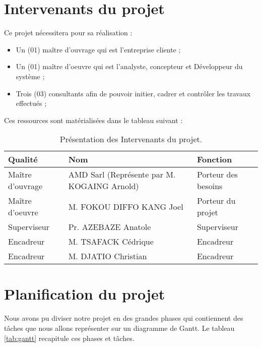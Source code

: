 \section{Intervenants du projet}
Ce projet nécessitera pour sa réalisation :
\begin{itemize}
    \item Un (01) maître d'ouvrage qui est l'entreprise cliente ;
    \item Un (01) maître d'oeuvre qui est l'analyste, concepteur et Développeur du système ;
    \item Trois (03) consultants afin de pouvoir initier, cadrer et contrôler les travaux effectués ;    
\end{itemize}

Ces ressources sont matérialisées dans le tableau suivant :
\begin{table}[H]
    \centering
    \caption{Présentation des Intervenants du projet.}
    \begin{tabular}[t]{|p{4cm}|p{7cm}|p{4cm}|}
        \hline
        \textbf{Qualité } & \textbf{Nom} & \textbf{Fonction} \\
        \hline\hline
        Maître d'ouvrage & AMD Sarl (Représente par M. KOGAING Arnold) & Porteur des besoins\\
        \hline
        Maître d'oeuvre & M. FOKOU DIFFO KANG Joel & Porteur du projet \\
        \hline
        Superviseur & Pr. AZEBAZE Anatole & Superviseur\\
        \hline
        Encadreur & M. TSAFACK Cédrique & Encadreur\\
        \hline
        Encadreur & M. DJATIO Christian & Encadreur\\
        \hline\hline
    \end{tabular}
    \label{tab:resmat}
\end{table}%



\section{Planification du projet}
Nous avons pu diviser notre projet en des grandes phases qui contiennent des tâches que nous allons représenter sur un diagramme de Gantt. Le tableau \ref{tab:gantt} recapitule ces phases et tâches.



